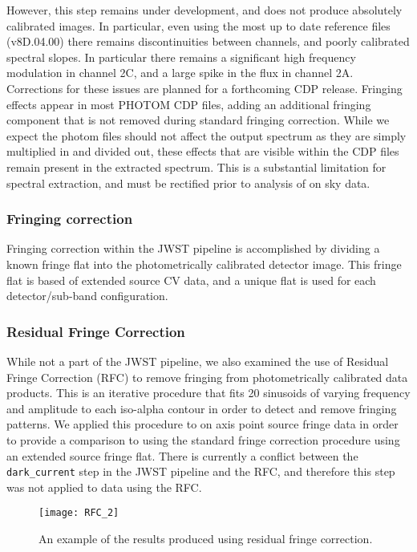 However, this step remains under development, and does not produce absolutely calibrated images. In particular, even using the most up to date reference files (v8D.04.00) there remains discontinuities between channels, and poorly calibrated spectral slopes.
In particular there remains a significant high frequency modulation in channel 2C, and a large spike in the flux in channel 2A.
Corrections for these issues are planned for a forthcoming CDP release.
Fringing effects appear in most PHOTOM CDP files, adding an additional fringing component that is not removed during standard fringing correction.
While we expect the photom files should not affect the output spectrum as they are simply multiplied in and divided out, these effects that are visible within the CDP files remain present in the extracted spectrum.
This is a substantial limitation for spectral extraction, and must be rectified prior to analysis of on sky data. 


\subsubsection{Fringing correction}
Fringing correction within the JWST pipeline is accomplished by dividing a known fringe flat into the photometrically calibrated detector image. 
This fringe flat is based of extended source CV data, and a unique flat is used for each detector/sub-band configuration.

\subsubsection{Residual Fringe Correction}
While not a part of the JWST pipeline, we also examined the use of Residual Fringe Correction (RFC) \parencite{Lahuis2003,Lahuis2018} to remove fringing from photometrically calibrated data products. 
This is an iterative procedure that fits 20 sinusoids of varying frequency and amplitude to each iso-alpha contour in order to detect and remove fringing patterns.
We applied this procedure to on axis point source fringe data in order to provide a comparison to using the standard fringe correction procedure using an extended source fringe flat.
There is currently a conflict between the \verb|dark_current| step in the JWST pipeline and the RFC, and therefore this step was not applied to data using the RFC.
\begin{figure}[t]
	\centering
	\texttt{[image: RFC\_2]}
	\caption{An example of the results produced using residual fringe correction.}
	\label{fig:RFC}
\end{figure}

